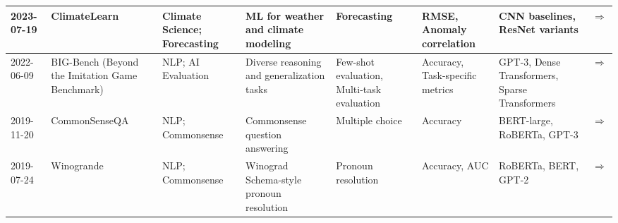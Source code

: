 \documentclass{article}
\begin{document}
\begin{landscape}
{\begin{longtable}{|p{1.5cm}|p{2.5cm}|p{2cm}|p{2cm}|p{3cm}|p{2cm}|p{2cm}|p{1cm}|}
2023-07-19 & ClimateLearn & Climate Science; Forecasting & ML for weather and climate modeling & Forecasting & RMSE, Anomaly correlation & CNN baselines, ResNet variants & \cite{nguyen2023climatelearnbenchmarkingmachinelearning} \href{https://arxiv.org/abs/2307.01909}{$\Rightarrow$ } \\ \hline
2022-06-09 & BIG-Bench (Beyond the Imitation Game Benchmark) & NLP; AI Evaluation & Diverse reasoning and generalization tasks & Few-shot evaluation, Multi-task evaluation & Accuracy, Task-specific metrics & GPT-3, Dense Transformers, Sparse Transformers & \cite{srivastava2023imitationgamequantifyingextrapolating} \href{https://arxiv.org/abs/2206.04615}{$\Rightarrow$ } \\ \hline
2019-11-20 & CommonSenseQA & NLP; Commonsense & Commonsense question answering & Multiple choice & Accuracy & BERT-large, RoBERTa, GPT-3 & \cite{talmor2019commonsenseqaquestionansweringchallenge} \href{https://arxiv.org/abs/1811.00937}{$\Rightarrow$ } \\ \hline
2019-07-24 & Winogrande & NLP; Commonsense & Winograd Schema-style pronoun resolution & Pronoun resolution & Accuracy, AUC & RoBERTa, BERT, GPT-2 & \cite{sakaguchi2019winograndeadversarialwinogradschema} \href{https://arxiv.org/abs/1907.10641}{$\Rightarrow$ } \\ \hline
\end{longtable}
}
\end{landscape}
\printbibliography
\end{document}
